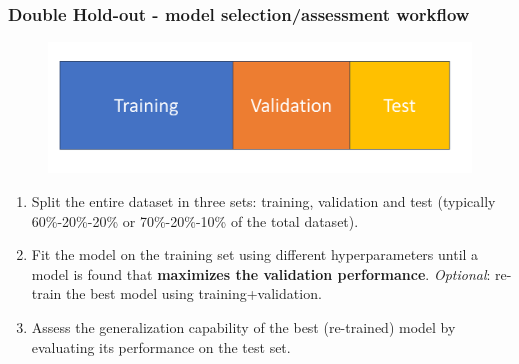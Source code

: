 \documentclass{beamer}
\begin{document}
	\begin{frame}
		\frametitle{Double Hold-out - model selection/assessment workflow}
		\begin{figure}
			\centering
			\includegraphics[scale=0.3]{images/hold-out}
		\end{figure}
		\begin{enumerate}
			\item Split the entire dataset in three sets: training, validation and test (typically 60\%-20\%-20\% or  70\%-20\%-10\% of the total dataset). 
			\item Fit the model on the training set using different hyperparameters until a model is found that \textbf{maximizes the validation performance}. \textit{Optional}:  re-train the best model using training+validation. 
			\item Assess the generalization capability of the best (re-trained) model by evaluating its performance on the test set.
		\end{enumerate}	
	\end{frame}
\end{document}
